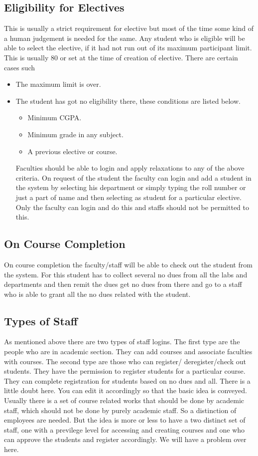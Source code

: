 \documentclass[a4paper,twoside]{article}
\begin{document}
\subsection{Eligibility for Electives}\label{sec:eligibility}
This is usually a strict requirement for elective but most of the time some kind of a human judgement is needed for the same. Any student who is eligible will be able to select the elective, if it had not run out of its maximum participant limit. This is usually 80 or set at the time of creation of elective. There are certain cases such 
\begin{itemize}
\item The maximum limit is over.
\item The student has got no eligibility there, these conditions are listed below.
\begin{itemize}
\item Minimum CGPA.
\item Minimum grade in any subject.
\item A previous elective or course.
\end{itemize}
Faculties should be able to login and apply relaxations to any of the above criteria. On request of the student the faculty can login and add  a student in the system by selecting his department or simply typing the roll number or just a part of name and then selecting as student for a particular elective. Only the faculty can login and do this and staffs should not be permitted to this. 
\end{itemize}
\subsection{On Course Completion}
On course completion the faculty/staff will be able to check out the student from the system. For this student has to collect several no dues from all the labs and departments and then remit the dues get no dues from there and go to a staff who is able to grant all the no dues related with the student.

\subsection{Types of Staff}
As mentioned above  there are two types of staff logins. The first type are the people who are in academic section. They can add courses and associate faculties with courses. The second type are those who can register/ deregister/check out students. They have the permission to register students for a particular course. They can complete registration for students based on no dues and all. There is a little doubt here. You can edit it accordingly so that the basic idea is conveyed. Usually there is a set of course related works that should be done by academic staff, which should not be done by purely academic staff. So a distinction of employees are needed. But the idea is more or less to have a two distinct set of staff, one with a previlege level for accessing and creating courses and one who can approve the students and register accordingly. We will have a problem over here.
\end{document}
